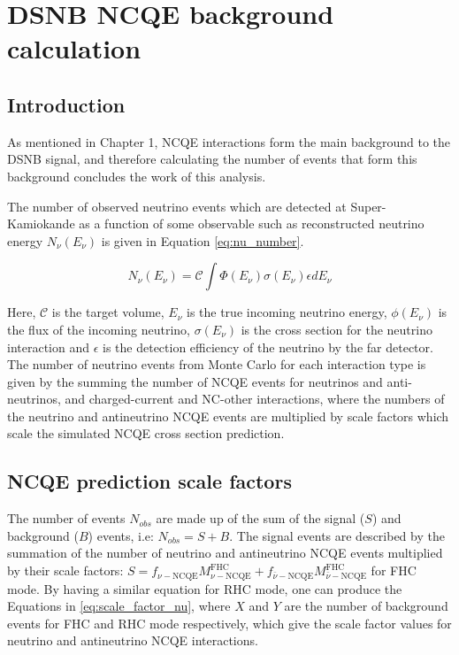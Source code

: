 \chapter{DSNB NCQE background calculation}
\label{chp:ncqe_xsec}


\section{Introduction}

As mentioned in Chapter 1, NCQE interactions form the main background to the DSNB signal, and therefore calculating the number of events that form this background concludes the work of this analysis. 

The number of observed neutrino events which are detected at Super-Kamiokande as a function of some observable such as reconstructed neutrino energy $N_{\nu}(E_{\nu})$ is given in Equation \ref{eq:nu_number}.

\begin{equation}
    N_\nu(E_\nu)=\mathcal{C} \int \Phi\left(E_\nu\right) \sigma\left(E_\nu\right) \epsilon d E_\nu
\label{eq:nu_number}
\end{equation}

Here, $\mathcal{C}$ is the target volume, $E_{\nu}$ is the true incoming neutrino energy, $\phi(E_{\nu})$ is the flux of the incoming neutrino, $\sigma(E_{\nu})$ is the cross section for the neutrino interaction and $\epsilon$ is the detection efficiency of the neutrino by the far detector. The number of neutrino events from Monte Carlo for each interaction type is given by the summing the number of NCQE events for neutrinos and anti-neutrinos, and charged-current and NC-other interactions, where the numbers of the neutrino and antineutrino NCQE events are multiplied by scale factors which scale the simulated NCQE cross section prediction.


\section{NCQE prediction scale factors}


The number of events $N_{obs}$ are made up of the sum of the signal ($S$) and background ($B$) events, i.e: $N_{obs} = S + B$. The signal events are described by the summation of the number of neutrino and antineutrino NCQE events multiplied by their scale factors: $S  = f_{\nu-\mathrm{NCQE}} M_{\nu-\mathrm{NCQE}}^{\mathrm{FHC}}+f_{\bar{\nu}-\mathrm{NCQE}} M_{\bar{\nu}-\mathrm{NCQE}}^{\mathrm{FHC}}$ for FHC mode. By having a similar equation for RHC mode, one can produce the Equations in \ref{eq:scale_factor_nu}, where $X$ and $Y$ are the number of background events for FHC and RHC mode respectively, which give the scale factor values for neutrino and antineutrino NCQE interactions. 


